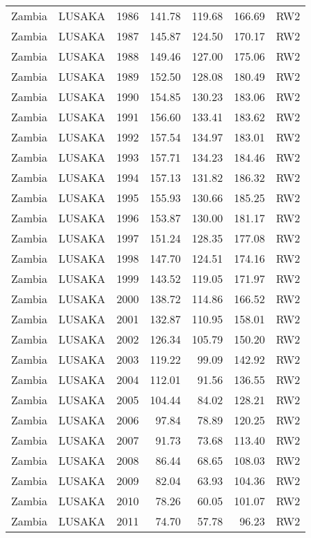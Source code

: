 \begin{longtable}{lllrrrl}
  Zambia & LUSAKA & 1986 & 141.78 & 119.68 & 166.69 & RW2 \\ 
  Zambia & LUSAKA & 1987 & 145.87 & 124.50 & 170.17 & RW2 \\ 
  Zambia & LUSAKA & 1988 & 149.46 & 127.00 & 175.06 & RW2 \\ 
  Zambia & LUSAKA & 1989 & 152.50 & 128.08 & 180.49 & RW2 \\ 
  Zambia & LUSAKA & 1990 & 154.85 & 130.23 & 183.06 & RW2 \\ 
  Zambia & LUSAKA & 1991 & 156.60 & 133.41 & 183.62 & RW2 \\ 
  Zambia & LUSAKA & 1992 & 157.54 & 134.97 & 183.01 & RW2 \\ 
  Zambia & LUSAKA & 1993 & 157.71 & 134.23 & 184.46 & RW2 \\ 
  Zambia & LUSAKA & 1994 & 157.13 & 131.82 & 186.32 & RW2 \\ 
  Zambia & LUSAKA & 1995 & 155.93 & 130.66 & 185.25 & RW2 \\ 
  Zambia & LUSAKA & 1996 & 153.87 & 130.00 & 181.17 & RW2 \\ 
  Zambia & LUSAKA & 1997 & 151.24 & 128.35 & 177.08 & RW2 \\ 
  Zambia & LUSAKA & 1998 & 147.70 & 124.51 & 174.16 & RW2 \\ 
  Zambia & LUSAKA & 1999 & 143.52 & 119.05 & 171.97 & RW2 \\ 
  Zambia & LUSAKA & 2000 & 138.72 & 114.86 & 166.52 & RW2 \\ 
  Zambia & LUSAKA & 2001 & 132.87 & 110.95 & 158.01 & RW2 \\ 
  Zambia & LUSAKA & 2002 & 126.34 & 105.79 & 150.20 & RW2 \\ 
  Zambia & LUSAKA & 2003 & 119.22 & 99.09 & 142.92 & RW2 \\ 
  Zambia & LUSAKA & 2004 & 112.01 & 91.56 & 136.55 & RW2 \\ 
  Zambia & LUSAKA & 2005 & 104.44 & 84.02 & 128.21 & RW2 \\ 
  Zambia & LUSAKA & 2006 & 97.84 & 78.89 & 120.25 & RW2 \\ 
  Zambia & LUSAKA & 2007 & 91.73 & 73.68 & 113.40 & RW2 \\ 
  Zambia & LUSAKA & 2008 & 86.44 & 68.65 & 108.03 & RW2 \\ 
  Zambia & LUSAKA & 2009 & 82.04 & 63.93 & 104.36 & RW2 \\ 
  Zambia & LUSAKA & 2010 & 78.26 & 60.05 & 101.07 & RW2 \\ 
  Zambia & LUSAKA & 2011 & 74.70 & 57.78 & 96.23 & RW2 \\ 

\end{longtable}
